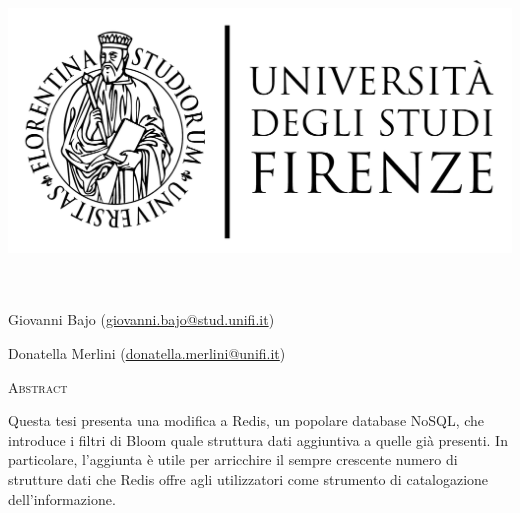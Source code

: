 \documentclass[ oneside,openright,titlepage,numbers=noenddot,%
                headinclude,footinclude,cleardoublepage=empty,
                BCOR=5mm,paper=a4,fontsize=11pt
                ]{scrreprt}
\begin{document}
\frenchspacing
\raggedbottom
{}
\pagestyle{plain}

\setlength{\parindent}{0pt}
\begin{titlepage}
    \begin{addmargin}[-2cm]{-2cm}
    \large
    \hfill
    \vfill

    \begin{center}
	    \begingroup
    	        \includegraphics[scale=0.15]{img/LOGO}\\
    	        \myFaculty \\
    	        \myDegree \\
    	        \vspace{0.5cm}
    	        \vspace{0.5cm}
	    \endgroup
    \end{center}

    \vfill

	\begin{description}[labelwidth=10em,leftmargin=!,font={\normalfont\scshape\color{Maroon}}]
		\item[Tesi] \myTitle
		\item[Studente] Giovanni Bajo (\href{mailto:giovanni.bajo@stud.unifi.it}{giovanni.bajo@stud.unifi.it})
		\item[Relatore] Donatella Merlini (\href{mailto:giovanni.bajo@stud.unifi.it}{donatella.merlini@unifi.it})
    \end{description}

    \vfill

    \textsc{\color{Maroon}Abstract}

    \medskip

    Questa tesi presenta una modifica a Redis, un popolare database NoSQL, che introduce i filtri di
    Bloom quale struttura dati aggiuntiva a quelle già presenti. In particolare, 
    l'aggiunta è utile per arricchire il sempre crescente numero di strutture dati che Redis offre agli
    utilizzatori come strumento di catalogazione dell'informazione.


\end{addmargin}
\end{titlepage}
\end{document}
